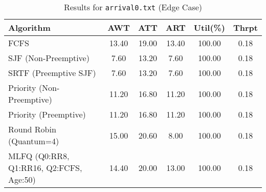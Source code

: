 \documentclass[12pt]{article}
\begin{document}
\begin{table}[htbp]
\centering
\caption{Results for \texttt{arrival0.txt} (Edge Case)}
\label{tab:arrival0_results}
\footnotesize
\begin{tabular}{@{}l S[table-format=3.2] S[table-format=3.2] S[table-format=3.2] S[table-format=3.2] S[table-format=1.2]@{}}
\toprule
Algorithm                                     & {AWT} & {ATT} & {ART} & {Util(\%)} & {Thrpt}\\
\midrule
FCFS                                         & 13.40         & 19.00            & 13.40          & 100.00          & 0.18 \\
SJF (Non-Preemptive)                         & 7.60          & 13.20            & 7.60           & 100.00          & 0.18 \\
SRTF (Preemptive SJF)                        & 7.60          & 13.20            & 7.60           & 100.00          & 0.18 \\
Priority (Non-Preemptive)                    & 11.20         & 16.80            & 11.20          & 100.00          & 0.18 \\
Priority (Preemptive)                        & 11.20         & 16.80            & 11.20          & 100.00          & 0.18 \\
Round Robin (Quantum=4)                      & 15.00         & 20.60            & 8.00           & 100.00          & 0.18 \\
MLFQ (Q0:RR8, Q1:RR16, Q2:FCFS, Age:50)      & 14.40         & 20.00            & 13.00          & 100.00          & 0.18 \\
\bottomrule
\end{tabular}
\end{table}
\end{document}
